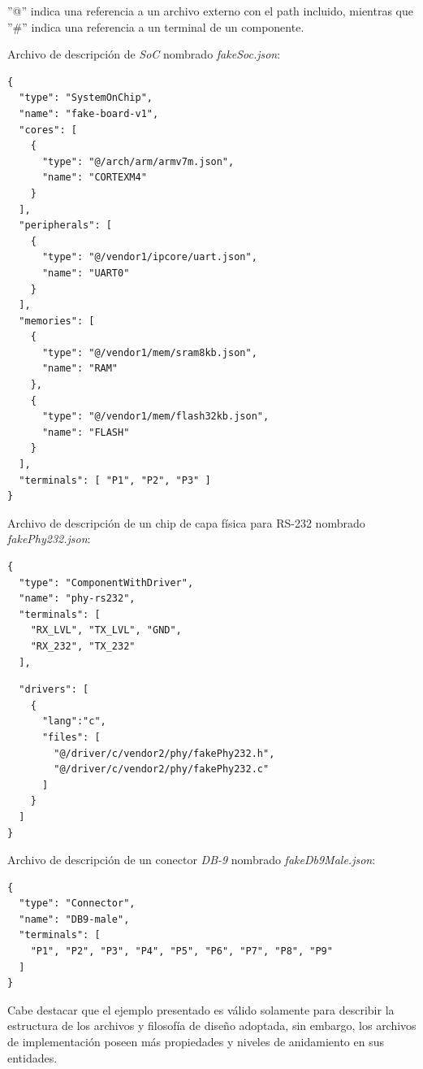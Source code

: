 ''@'' indica una referencia a un archivo externo con el path incluido, mientras que ''\#'' indica una referencia a un terminal de un componente.

Archivo de descripción de \emph{SoC} nombrado \emph{fakeSoc.json}:

\begin{verbatim}
{
  "type": "SystemOnChip",
  "name": "fake-board-v1",
  "cores": [
    {
      "type": "@/arch/arm/armv7m.json",
      "name": "CORTEXM4"
    }
  ],
  "peripherals": [
    {
      "type": "@/vendor1/ipcore/uart.json",
      "name": "UART0"
    }
  ],
  "memories": [
    {
      "type": "@/vendor1/mem/sram8kb.json",
      "name": "RAM"
    },
    {
      "type": "@/vendor1/mem/flash32kb.json",
      "name": "FLASH"
    }
  ],
  "terminals": [ "P1", "P2", "P3" ]
}
\end{verbatim}

Archivo de descripción de un chip de capa física para RS-232  nombrado \emph{fakePhy232.json}:

\begin{verbatim}
{
  "type": "ComponentWithDriver",
  "name": "phy-rs232",
  "terminals": [ 
    "RX_LVL", "TX_LVL", "GND",
    "RX_232", "TX_232"
  ],
\end{verbatim}

\pagebreak 
\begin{verbatim}
  "drivers": [
    {
      "lang":"c",
      "files": [
        "@/driver/c/vendor2/phy/fakePhy232.h",
        "@/driver/c/vendor2/phy/fakePhy232.c"      
      ]      
    }
  ]
}
\end{verbatim}

Archivo de descripción de un conector \emph{DB-9} nombrado \emph{fakeDb9Male.json}:

\begin{verbatim}
{
  "type": "Connector",
  "name": "DB9-male",
  "terminals": [ 
    "P1", "P2", "P3", "P4", "P5", "P6", "P7", "P8", "P9"
  ]
}
\end{verbatim}

Cabe destacar que el ejemplo presentado es válido solamente para describir la estructura de los archivos y filosofía de diseño adoptada, sin embargo, los archivos de implementación poseen más propiedades y niveles de anidamiento en sus entidades.
